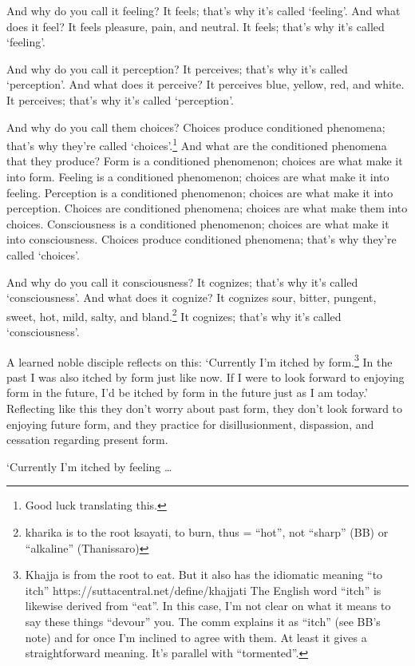 \documentclass[12pt,openany]{book}%
\begin{document}
And why do you call it feeling? It feels; that’s why it’s called ‘feeling’. And what does it feel? It feels pleasure, pain, and neutral. It feels; that’s why it’s called ‘feeling’. 

And why do you call it perception? It perceives; that’s why it’s called ‘perception’. And what does it perceive? It perceives blue, yellow, red, and white. It perceives; that’s why it’s called ‘perception’. 

And why do you call them choices? Choices produce conditioned phenomena; that’s why they’re called ‘choices’.\footnote{Good luck translating this. } And what are the conditioned phenomena that they produce? Form is a conditioned phenomenon; choices are what make it into form. Feeling is a conditioned phenomenon; choices are what make it into feeling. Perception is a conditioned phenomenon; choices are what make it into perception. Choices are conditioned phenomena; choices are what make them into choices. Consciousness is a conditioned phenomenon; choices are what make it into consciousness. Choices produce conditioned phenomena; that’s why they’re called ‘choices’. 

And why do you call it consciousness? It cognizes; that’s why it’s called ‘consciousness’. And what does it cognize? It cognizes sour, bitter, pungent, sweet, hot, mild, salty, and bland.\footnote{kharika is to the root ksayati, to burn, thus = “hot”, not “sharp” (BB) or “alkaline” (Thanissaro) } It cognizes; that’s why it’s called ‘consciousness’. 

A learned noble disciple reflects on this: ‘Currently I’m itched by form.\footnote{Khajja is from the root to eat. But it also has the idiomatic meaning “to itch” https://suttacentral.net/define/khajjati The English word “itch” is likewise derived from “eat”. In this case, I’m not clear on what it means to say these things “devour” you. The comm explains it as “itch” (see BB’s note) and for once I’m inclined to agree with them. At least it gives a straightforward meaning. It’s parallel with “tormented”. } In the past I was also itched by form just like now. If I were to look forward to enjoying form in the future, I’d be itched by form in the future just as I am today.’ Reflecting like this they don’t worry about past form, they don’t look forward to enjoying future form, and they practice for disillusionment, dispassion, and cessation regarding present form. 

‘Currently I’m itched by feeling … 
\end{document}
